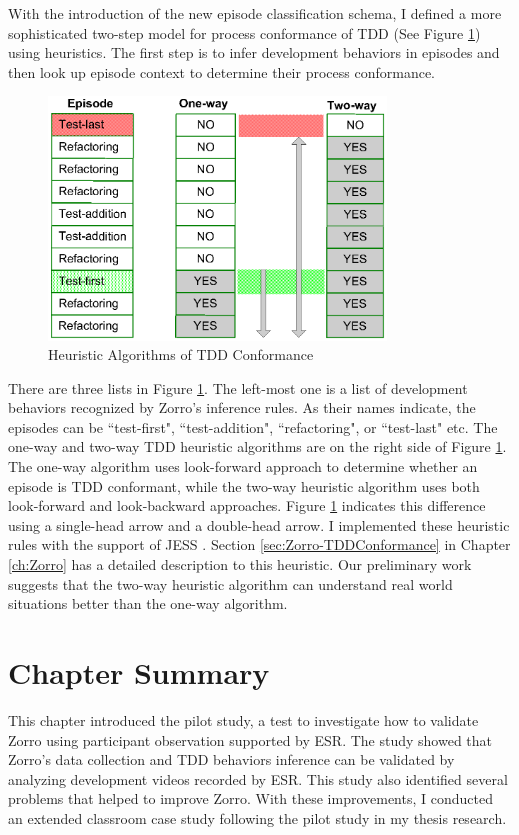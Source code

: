 With the introduction of the new episode classification schema, I defined a more sophisticated two-step model for process conformance of TDD (See Figure \ref{fig:heuristic}) using heuristics. The first step is to infer development behaviors in episodes and then look up episode context to determine their process conformance.
\begin{figure}[htbp]
  \centering
  \includegraphics[width=0.8\textwidth]{figs/HeuristicAlgorithms}
  \caption{Heuristic Algorithms of TDD Conformance}
  \label{fig:heuristic}
\end{figure}
There are three lists in Figure \ref{fig:heuristic}. The left-most one is a list of development behaviors recognized by Zorro's inference rules. As their names indicate, the episodes can be ``test-first", ``test-addition", ``refactoring", or ``test-last" etc. The one-way and two-way TDD heuristic algorithms are on the right side of Figure \ref{fig:heuristic}. The one-way algorithm uses look-forward approach to determine whether an episode is TDD conformant, while the two-way heuristic algorithm uses both look-forward and look-backward approaches. Figure \ref{fig:heuristic} indicates this difference using a single-head arrow and a double-head arrow. I implemented these heuristic rules with the support of JESS \cite{Friedman-Hill:03}. Section \ref{sec:Zorro-TDDConformance} in Chapter \ref{ch:Zorro} has a detailed description to this heuristic. Our preliminary work suggests that the two-way heuristic algorithm can understand real world situations better than the one-way algorithm.

\section{Chapter Summary}
This chapter introduced the pilot study, a test to investigate how to validate Zorro using participant observation supported by ESR. The study showed that Zorro's data collection and TDD behaviors inference can be validated by analyzing development videos recorded by ESR. This study also identified several problems that helped to improve Zorro. With these improvements, I conducted an extended classroom case study following the pilot study in my thesis research. 